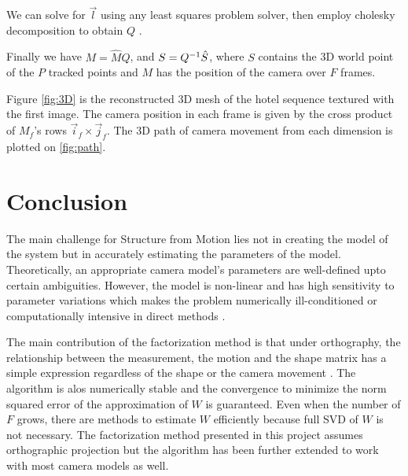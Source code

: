 We can solve for $\vec l$ using any least squares problem solver, then
employ cholesky decomposition to obtain $Q$ \cite{Morita}.

Finally we have $M = \hat MQ$, and $S =Q^{-1} \hat S$, where $S$
contains the 3D world point of the $P$ tracked points and $M$ has the
position of the camera over $F$ frames. 

Figure \ref{fig:3D} is the reconstructed 3D mesh of the hotel
sequence textured with the first image.
The camera position in each frame is given by the cross product of
$M_f$'s rows $\vec i_f \times \vec j_f$. The 3D path of camera
movement from each dimension is plotted on \ref{fig:path}.



\section{Conclusion}
\label{sec:conclusion}


The main challenge for Structure from Motion lies not in creating the
model of the system but in accurately estimating the parameters of the
model. Theoretically, an appropriate camera model's parameters are well-defined upto certain
ambiguities. However, the model is non-linear and has high sensitivity
to parameter variations which makes the problem numerically
ill-conditioned or computationally intensive in direct methods \cite{Morris}.

The main contribution of the factorization method is that under
orthography, the relationship between the measurement, the motion and
the shape matrix has a simple expression regardless of the shape or
the camera movement \cite{Tomasi}. The algorithm is alos numerically stable and the convergence to minimize the
norm squared error of the approximation of $W$ is guaranteed. Even
when the number of $F$ grows, there are methods to estimate $W$
efficiently because full SVD of $W$ is not necessary. 
The factorization method presented in this project assumes orthographic
projection but the algorithm has been further extended to work with
most camera models as well\cite{Morris}. 


